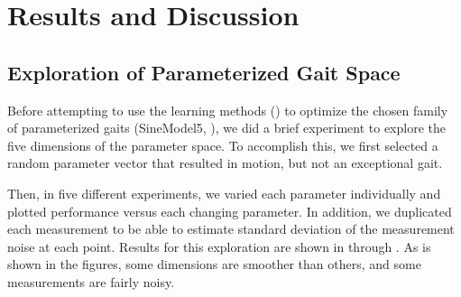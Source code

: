 \section{Results and Discussion}




\subsection{Exploration of Parameterized Gait Space}


Before attempting to use the learning methods
() to optimize the chosen family of
parameterized gaits (SineModel5, ), we did a brief
experiment to explore the five dimensions of the parameter space. To
accomplish this, we first selected a random parameter vector that resulted
in motion, but not an exceptional gait.

Then, in five different experiments, we varied each parameter
individually and plotted performance versus each changing parameter.
In addition, we duplicated each measurement to be able to estimate
standard deviation of the measurement noise at each point.  Results
for this exploration are shown in  through
.  As is shown in the figures, some dimensions
are smoother than others, and some measurements are fairly noisy.




